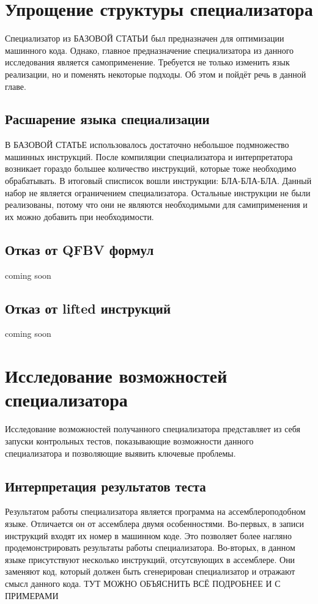 \documentclass{spbau-diploma}
\begin{document}
\section{Упрощение структуры специализатора}
Специализатор из {\LARGE БАЗОВОЙ СТАТЬИ} был предназначен для оптимизации машинного кода. Однако, главное предназначение специализатора из данного исследования является самоприменение. Требуется не только изменить язык реализации, но и поменять некоторые подходы. Об этом и пойдёт речь в данной главе.
\subsection{ Расшарение языка специализации}
В {\LARGE БАЗОВОЙ СТАТЬЕ} использовалось достаточно небольшое подмножество машинных инструкций. После компиляции специализатора и интерпретатора возникает гораздо большее количество инструкций, которые тоже необходимо обрабатывать. В итоговый списписок вошли инструкции: {\Large БЛА-БЛА-БЛА}. Данный набор не является ограничением специализатора. Остальные инструкции не были реализованы, потому что они не являются необходимыми для самиприменения и их можно добавить при необходимости.
\subsection{ Отказ от QFBV формул}
coming soon
\subsection{ Отказ от lifted инструкций}
coming soon
\section{Исследование возможностей специализатора}
Исследование возможностей получанного специализатора представляет из себя запуски контрольных тестов, показывающие возможности данного специализатора и позволяющие выявить ключевые проблемы.

\subsection*{Интерпретация результатов теста}
Результатом работы специализатора является программа на ассемблероподобном языке. Отличается он от ассемблера двумя особенностями. Во-первых, в записи инструкций входят их номер в машинном коде. Это позволяет более нагляно продемонстрировать результаты работы специализатора. Во-вторых, в данном языке присутствуют несколько инструкций, отсутсвующих в ассемблере. Они заменяют код, который должен быть сгенерирован специализатор и отражают смысл данного кода. {\Large ТУТ МОЖНО ОБЪЯСНИТЬ ВСЁ ПОДРОБНЕЕ И С ПРИМЕРАМИ}
\end{document}
